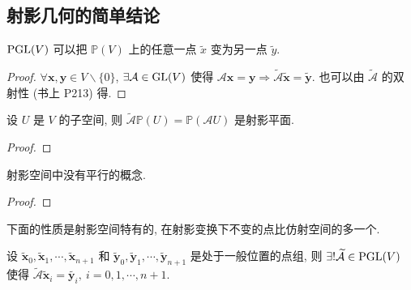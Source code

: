 \documentclass{ctexart}
\begin{document}
\subsection{射影几何的简单结论}
\begin{theorem}
    $\operatorname{PGL} (V)$ 可以把 $\mathbb{P}(V)$ 上的任意一点 $\tilde{x}$ 变为另一点 $\tilde{y}$.
\end{theorem}
\begin{proof}
    $\forall\boldsymbol{x},\boldsymbol{y}\in V\backslash\{0\}$, $\exists\mathcal{A}\in\operatorname{GL} (V)$ 使得 $\mathcal{A}\boldsymbol{x}=\boldsymbol{y}\Rightarrow\widetilde{\mathcal{A}}\tilde{\boldsymbol{x}}=\tilde{\boldsymbol{y}}$. 也可以由 $\widetilde{\mathcal{A}}$ 的双射性 (书上 P213) 得.
\end{proof}
\begin{theorem}
    设 $U$ 是 $V$ 的子空间, 则 $\widetilde{\mathcal{A}}\mathbb{P}(U)=\mathbb{P}(\mathcal{A}U)$ 是射影平面.
\end{theorem}
\begin{proof}
    
\end{proof}
\begin{theorem}
    射影空间中没有平行的概念.
\end{theorem}
\begin{proof}
    
\end{proof}
下面的性质是射影空间特有的, 在射影变换下不变的点比仿射空间的多一个.
\begin{theorem}[书上的定理 3]\label{t3.10}
    设 $\tilde{\boldsymbol{x}}_0,\tilde{\boldsymbol{x}}_1,\cdots,\tilde{\boldsymbol{x}}_{n+1}$ 和 $\tilde{\boldsymbol{y}}_0,\tilde{\boldsymbol{y}}_1,\cdots,\tilde{\boldsymbol{y}}_{n+1}$ 是处于一般位置的点组, 则 $\exists!\widetilde{\mathcal{A}}\in\operatorname{PGL} (V)$ 使得 $\widetilde{\mathcal{A}}\tilde{\boldsymbol{x}}_i=\tilde{\boldsymbol{y}_i},\ i=0,1,\cdots,n+1$.
\end{theorem}
\end{document}
